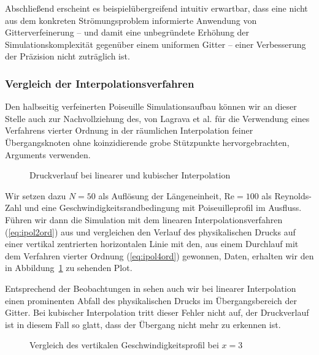 \bigskip

Abschließend erscheint es beispielübergreifend intuitiv erwartbar, dass eine nicht aus dem konkreten Strömungsproblem informierte Anwendung von Gitterverfeinerung -- und damit eine unbegründete Erhöhung der Simulationskomplexität gegenüber einem uniformen Gitter -- einer Verbesserung der Präzision nicht zuträglich ist.

\subsubsection{Vergleich der Interpolationsverfahren}

Den halbseitig verfeinerten Poiseuille Simulationsaufbau können wir an dieser Stelle auch zur Nachvollziehung des, von Lagrava et al. für die Verwendung eines Verfahrens vierter Ordnung in der räumlichen Interpolation feiner Übergangsknoten ohne koinzidierende grobe Stützpunkte hervorgebrachten, Arguments verwenden.

\begin{figure}[h]
\begin{adjustbox}{center}

\end{adjustbox}
\caption{Druckverlauf bei linearer und kubischer Interpolation \cite[vgl.~Abb.~11]{Lagrava12}}
\label{fig:PoiseuilleMassloss}
\end{figure}

Wir setzen dazu \(N=50\) als Auflösung der Längeneinheit, \(\text{Re}=100\) als Reynolds-Zahl und eine Geschwindigkeitsrandbedingung mit Poiseuilleprofil im Ausfluss. Führen wir dann die Simulation mit dem linearen Interpolationsverfahren (\ref{eq:ipol2ord}) aus und vergleichen den Verlauf des physikalischen Drucks auf einer vertikal zentrierten horizontalen Linie mit den, aus einem Durchlauf mit dem Verfahren vierter Ordnung (\ref{eq:ipol4ord}) gewonnen, Daten, erhalten wir den in Abbildung~\ref{fig:PoiseuilleMassloss} zu sehenden Plot.

Entsprechend der Beobachtungen in \cite[Kap.~3.7]{Lagrava12} sehen auch wir bei linearer Interpolation einen prominenten Abfall des physikalischen Drucks im Übergangsbereich der Gitter. Bei kubischer Interpolation tritt dieser Fehler nicht auf, der Druckverlauf ist in diesem Fall so glatt, dass der Übergang nicht mehr zu erkennen ist.

\begin{figure}[h]
\begin{adjustbox}{center}

\end{adjustbox}
\caption{Vergleich des vertikalen Geschwindigkeitsprofil bei \(x=3\)}
\label{fig:PoiseuilleOutflowProfile}
\end{figure}

